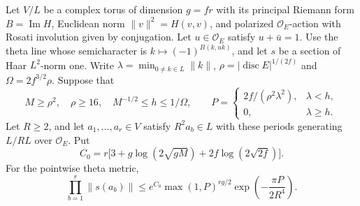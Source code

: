 \begin{auxlemma}
\label{lem:eta-period-decay}
Let \(V/L\) be a complex torus of dimension \(g=fr\) with its
principal Riemann form \(B=\operatorname{Im}H\), Euclidean norm
\(\|v\|^2=H(v,v)\), and polarized \(\mathcal O_E\)-action with
Rosati involution given by conjugation. Let
\(u\in\mathcal O_E\) satisfy \(u+\bar u=1\). Use the theta line
whose semicharacter is \(k\mapsto(-1)^{B(k,uk)}\), and let
\(s\) be a section of Haar \(L^2\)-norm one. Write
\(\lambda=\min_{0\ne k\in L}\|k\|\),
\(\rho=|\operatorname{disc}E|^{1/(2f)}\) and
\(\Omega=2f^{3/2}\rho\). Suppose that
\[
 M\ge\rho^2,\quad \rho\ge16,\quad
 M^{-1/2}\le h\le 1/\Omega,\qquad
 P=\begin{cases}
 2f/(\rho^2\lambda^2),&\lambda<h,\\
 0,&\lambda\ge h.
 \end{cases}
\]
Let \(R\ge2\), and let \(a_1,\ldots,a_r\in V\) satisfy
\(R^2a_b\in L\) with these periods generating \(L/RL\) over
\(\mathcal O_E\). Put
\[
 C_0=r\bigl[3+g\log(2\sqrt{gM})
                  +2f\log(2\sqrt{2f})\bigr].
\]
For the pointwise theta metric,
\begin{equation}\label{eq:eta-period-decay}
 \prod_{b=1}^r\|s(a_b)\|
 \le e^{C_0}\max(1,P)^{rg/2}
                 \exp\!\left(-\frac{\pi P}{2R^4}\right).
\end{equation}
\end{auxlemma}
